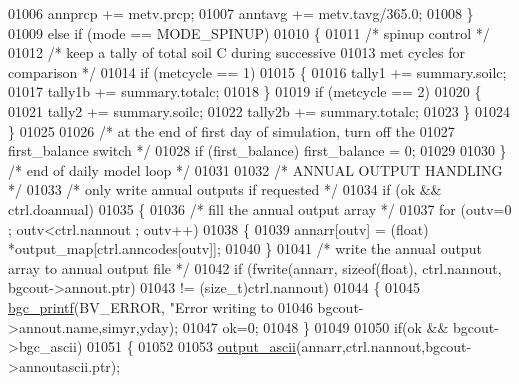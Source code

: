 \begin{DoxyCode}
{{{{{{{{{{{{{{{{{{{{{{{{{{{{{{{{{{{{{{{{{{{{{01006                 annprcp += metv.prcp;
01007                 anntavg += metv.tavg/365.0;
01008             \}
01009             \textcolor{keywordflow}{else} \textcolor{keywordflow}{if} (mode == MODE\_SPINUP)
01010             \{
01011                 \textcolor{comment}{/* spinup control */}
01012                 \textcolor{comment}{/* keep a tally of total soil C during successive}
01013 \textcolor{comment}{                met cycles for comparison */}
01014                 \textcolor{keywordflow}{if} (metcycle == 1)
01015                 \{
01016                     tally1 += summary.soilc;
01017                     tally1b += summary.totalc;
01018                 \}
01019                 \textcolor{keywordflow}{if} (metcycle == 2)
01020                 \{
01021                     tally2 += summary.soilc;
01022                     tally2b += summary.totalc;
01023                 \}
01024             \}
01025             
01026             \textcolor{comment}{/* at the end of first day of simulation, turn off the }
01027 \textcolor{comment}{            first\_balance switch */}
01028             \textcolor{keywordflow}{if} (first\_balance) first\_balance = 0;
01029 
01030         \}   \textcolor{comment}{/* end of daily model loop */}
01031         
01032         \textcolor{comment}{/* ANNUAL OUTPUT HANDLING */}
01033         \textcolor{comment}{/* only write annual outputs if requested */}
01034         \textcolor{keywordflow}{if} (ok && ctrl.doannual)
01035         \{
01036             \textcolor{comment}{/* fill the annual output array */}
01037             \textcolor{keywordflow}{for} (outv=0 ; outv<ctrl.nannout ; outv++)
01038             \{
01039                 annarr[outv] = (float) *output\_map[ctrl.anncodes[outv]];
01040             \}
01041             \textcolor{comment}{/* write the annual output array to annual output file */}
01042             \textcolor{keywordflow}{if} (fwrite(annarr, \textcolor{keyword}{sizeof}(\textcolor{keywordtype}{float}), ctrl.nannout, bgcout->annout.ptr)
01043                 != (\textcolor{keywordtype}{size\_t})ctrl.nannout)
01044             \{
01045                 \hyperlink{bgc__io_8c_af287cce6e2aede1ce337de9319e80d0d}{bgc\_printf}(BV\_ERROR, \textcolor{stringliteral}{"Error writing to %
01046                     bgcout->annout.name,simyr,yday);
01047                 ok=0;
01048             \}
01049             
01050             \textcolor{keywordflow}{if}(ok && bgcout->bgc\_ascii)
01051             \{
01052             
01053                 \hyperlink{output__ascii_8c_a2d026e2a6b7b7727a322ea7e0d43bec7}{output\_ascii}(annarr,ctrl.nannout,bgcout->annoutascii.ptr);
}}}}}}}}}}}}}}}}}}}}}}}}}}}}}}}}}}}}}}}}}}}}}}
\end{DoxyCode}
